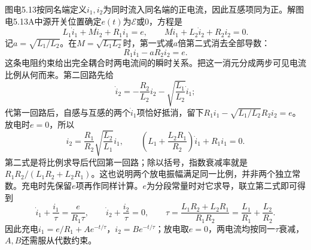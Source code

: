 \documentclass[UTF8,fontset=fandol,a4paper,11pt]{ctexart}
\begin{document}
图电5.13按同名端定义$i_1,i_2$为同时流入同名端的正电流，因此互感项同为正。解图电5.13A中源开关位置确定$e(t)$为$\mathcal E$或$0$，方程是
\[
 L_1\dot i_1+M\dot i_2+R_1i_1=e,\qquad
 M\dot i_1+L_2\dot i_2+R_2i_2=0.
\]
记$a=\sqrt{L_1/L_2}$。在$M=\sqrt{L_1L_2}$时，第一式减$a$倍第二式消去全部导数：
\[
 \boxed{R_1i_1-aR_2i_2=e.}
\]
这条电阻约束给出完全耦合时两电流间的瞬时关系。把这一消元分成两步可见电流比例从何而来。第二回路先给
\[
\dot i_2=-\frac{R_2}{L_2}i_2-\sqrt{\frac{L_1}{L_2}}\dot i_1;
\]
代第一回路后，自感与互感的两个$\dot i_1$项恰好抵消，留下$R_1i_1-\sqrt{L_1/L_2}R_2i_2=e$。放电时$e=0$，所以
\[
i_2=\frac{R_1}{R_2}\sqrt{\frac{L_2}{L_1}}i_1,\qquad
\left(L_1+\frac{L_2R_1}{R_2}\right)\dot i_1+R_1i_1=0.
\]
第二式是将比例求导后代回第一回路；除以括号，指数衰减率就是$R_1R_2/(L_1R_2+L_2R_1)$。这也说明两个放电振幅满足同一比例，并非两个独立常数。充电时先保留$e$项再作同样计算。$e$为分段常量时对它求导，联立第二式即可得到
\[
 \dot i_1+\frac{i_1}{\tau}=\frac e{R_1\tau},
 \qquad \dot i_2+\frac{i_2}{\tau}=0,\qquad
 \boxed{\tau=\frac{L_1R_2+L_2R_1}{R_1R_2}
 =\frac{L_1}{R_1}+\frac{L_2}{R_2}.}
\]
因此充电$i_1=e/R_1+A e^{-t/\tau}$，$i_2=B e^{-t/\tau}$；放电取$e=0$，两电流均按同一$\tau$衰减，$A,B$还需服从代数约束。
\end{document}
